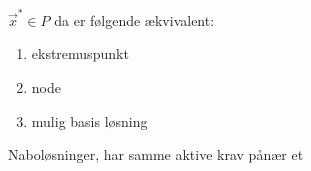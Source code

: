     

\begin{stn}
$\vec{x}^* \in P$ da er følgende ækvivalent:
\begin{enumerate}[label=(\alph*)]
\item ekstremuspunkt
 \item node
 \item mulig basis løsning
\end{enumerate}
\end{stn}



\begin{defn}[Naboløsninger]
Naboløsninger, har samme aktive krav pånær et
\end{defn}

